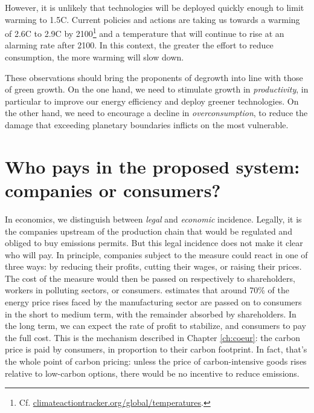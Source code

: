 \documentclass[a5paper,english,openany]{memoir}
\begin{document}
However, it is unlikely that technologies will be deployed quickly enough to limit warming to 1.5\textdegree{}C. Current policies and actions are taking us towards a warming of 2.6\textdegree{}C to 2.9\textdegree{}C by 2100\footnote{Cf. \href{https://climateactiontracker.org/global/temperatures/}{climateactiontracker.org/global/temperatures}.} and a temperature that will continue to rise at an alarming rate after 2100. In this context, the greater the effort %
to reduce consumption, the more warming will slow %
down. 

These observations should bring the proponents of degrowth into line with those of green growth. On the one hand, we need to stimulate growth in \textit{productivity}, in particular to improve our energy efficiency and deploy greener technologies. On the other hand, we need to encourage a decline in \textit{overconsumption}, to reduce the damage that exceeding planetary boundaries inflicts on the most vulnerable. 

\section*{\normalsize Who pays in the proposed system: companies or consumers?}\label{q:incidence}

In economics, we distinguish between \textit{legal} and \textit{economic} incidence. Legally, it is the companies upstream of the production chain that would be regulated and obliged to buy emissions permits. But this legal incidence does not make it clear who will pay. In principle, %
companies subject to the measure could react in one of three ways: by reducing their profits, cutting their wages, or raising their prices. The cost of the measure would then be passed on respectively to shareholders, workers in polluting sectors, or consumers. \cite{ganapati_energy_2020} estimates that around 70\% of the energy price rises faced by the manufacturing sector are passed on to consumers in the short to medium term, with the remainder absorbed by shareholders. In the long term, we can expect the rate of profit to stabilize, and consumers to pay the full cost. This is the mechanism described in Chapter \ref{ch:coeur}: the carbon price is paid by consumers, in proportion to their carbon footprint. In fact, that's the whole point of carbon pricing: unless the price of carbon-intensive goods rises relative to low-carbon options, there would be no incentive to reduce emissions.
\end{document}
